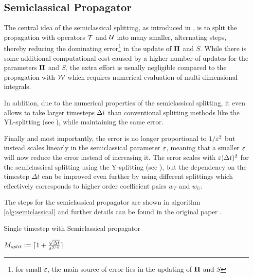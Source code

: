 \subsection{Semiclassical Propagator}
\label{sub:semiclassical_propagator}
%
The central idea of the semiclassical splitting, as introduced in \cite{GH_convsemiclassical},
is to split the propagation with operators $\mathcal{T}$ and $\mathcal{U}$ into many smaller, alternating steps, thereby reducing the dominating error\footnote{for small $\varepsilon$,
the main source of error lies in the updating of $\bm{\Pi}$ and $S$} in the update of $\bm{\Pi}$ and $S$.
While there is some additional computational cost caused by a higher number of updates for the parameters $\bm{\Pi}$ and $S$, the extra effort is usually negligible compared to the propagation with $\mathcal{W}$ which requires numerical evaluation of multi-dimensional integrals. 
\par\medskip
%
In addition, due to the numerical properties of the semiclassical splitting, 
it even allows to take larger timesteps $\Delta t$ than conventional
splitting methods like the YL-splitting (see \cite{GH_convsemiclassical}), while maintaining the same error.
\par\medskip
%
Finally and most importantly, the error is no longer proportional to $1/\varepsilon^2$ but instead
scales linearly in the semiclassical parameter $\varepsilon$,
meaning that a smaller $\varepsilon$ will now reduce the error instead of increasing it.
The error scales with $\varepsilon (\Delta t)^2$ for the semiclassical splitting using the Y-splitting (see \cite{GH_convsemiclassical}),
but the dependency on the timestep $\Delta t$ can be improved even further by using different
splittings which effectively corresponds to higher order coefficient pairs $w_T$ and $w_U$.
\par\medskip
%
The steps for the semiclassical propagator are shown in algorithm \ref{alg:semiclassical} and 
further details can be found in the original paper \cite{GH_convsemiclassical}.
%
\begin{algorithm}[h]
	\caption{Single timestep with Semiclassical propagator}
	\label{alg:semiclassical}
	\begin{algorithmic}
	\State
		\State
		\State $M_{split} := \lceil 1 + \frac{\sqrt{\Delta t}}{\varepsilon^{3/4}} \rceil$
		\State
		\State {}
		\State {}
		\State {}
		\State
	\EndProcedure
	\end{algorithmic}
\end{algorithm}


